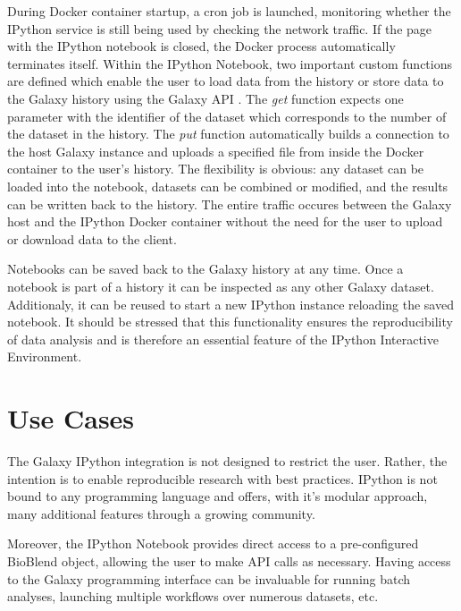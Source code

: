 \documentclass{bioinfo}
\begin{document}
\begin{methods}
During Docker container startup, a cron job is launched, monitoring whether the IPython service
is still being used by checking the network traffic. If the page with the IPython notebook is closed, the
Docker process automatically terminates itself. Within the IPython Notebook, 
two important custom functions are defined which enable the
user to load data from the history or store data to the Galaxy history using the Galaxy API \citep{Sloggett2013}.
The \textit{get} function expects one parameter with the identifier of the dataset which corresponds to the number
of the dataset in the history. The \textit{put} function automatically builds a connection to the host
Galaxy instance and uploads a specified file from inside the Docker container to the user's
history. The flexibility is obvious: any dataset can be
loaded into the notebook, datasets can be combined or modified, and the results can be written back to the history.
The entire traffic occures between the Galaxy host and the IPython Docker container without the need for the user to upload or download data to the client. 

Notebooks can be saved back to the Galaxy history at any time. Once a notebook is part of a history 
it can be inspected as any other Galaxy dataset. 
Additionaly, it can be reused to start a new IPython instance reloading the saved notebook. 
It should be stressed that this functionality ensures the reproducibility of data analysis and is therefore an essential
feature of the IPython Interactive Environment.


\section{Use Cases}
The Galaxy IPython integration is not designed to restrict the user. Rather, the intention is to enable
reproducible research with best practices. IPython is not bound to any programming language 
and offers, with it's modular approach, many additional features through a growing community.

Moreover, the IPython Notebook provides direct access to a pre-configured
BioBlend object, allowing the user to make API calls as necessary. Having access to the Galaxy programming interface
can be invaluable for running batch analyses, launching multiple workflows over numerous datasets, etc. 


\end{methods}
\end{document}
